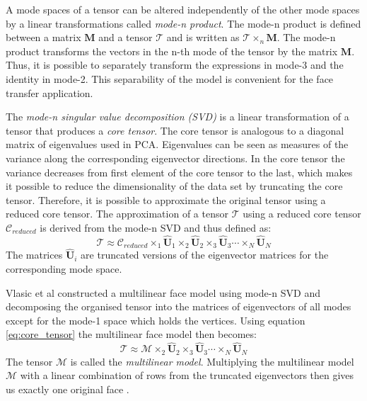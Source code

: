 \documentclass[11pt,a4paper]{report}
\begin{document}
A mode spaces of
a tensor can be altered independently of the other
mode spaces by a linear transformations called \textit{mode-n product}. The
mode-n product is defined between a matrix $\mathbf{M}$ and a tensor
$\mathscr{T}$ and is written as $\mathscr{T} \times_n \mathbf{M}$. The mode-n
product transforms the vectors in the n-th mode of the tensor by the matrix
$\mathbf{M}$. Thus, it is possible to separately transform the expressions in
mode-3 and the identity in mode-2. This separability of the model is convenient for the face transfer application.


The \textit{mode-n singular value decomposition
  (SVD)} is a linear transformation of a tensor that produces a \textit{core
  tensor}. The core tensor is analogous to a diagonal matrix of eigenvalues used
in PCA. Eigenvalues can be seen as measures of the variance along the
corresponding eigenvector directions. In the core tensor the variance decreases from first element of the
core tensor to the last, which makes it possible to reduce the dimensionality of
the data set by truncating the core tensor. Therefore, it is possible to
approximate the original tensor using a reduced core tensor. The approximation
of a tensor
$\mathscr{T}$ using a reduced core tensor $\mathscr{C}_{reduced}$ is derived from the
mode-n SVD and thus defined as:
\begin{equation} \label{eq:core_tensor}
\mathscr{T} \approx \mathscr{C}_{reduced} \times_1 \hat{\mathbf{U}}_1 \times_2
\hat{\mathbf{U}}_2 \times_3 \hat{\mathbf{U}}_3 \dotsb \times_N \hat{\mathbf{U}}_N
\end{equation}
The matrices $\hat{\mathbf{U}}_i$ are truncated versions of the eigenvector
matrices for the corresponding mode space.

Vlasic et al constructed a multilinear
face model using mode-n SVD and decomposing the organised tensor into the
matrices of eigenvectors of all modes except for the mode-1
space which holds the vertices. Using equation \ref{eq:core_tensor} the
multilinear face model then becomes:
\begin{equation} \label{eq:multilin_face}
\mathscr{T} \approx \mathscr{M} \times_2
\hat{\mathbf{U}}_2 \times_3 \hat{\mathbf{U}}_3 \dotsb \times_N \hat{\mathbf{U}}_N
\end{equation}
The tensor $\mathscr{M}$ is called the \textit{multilinear model}. Multiplying
the multilinear model $\mathscr{M}$ with a linear combination of rows from the truncated eigenvectors
then gives us exactly one original face \cite{faceTransfer05}. 
\end{document}
